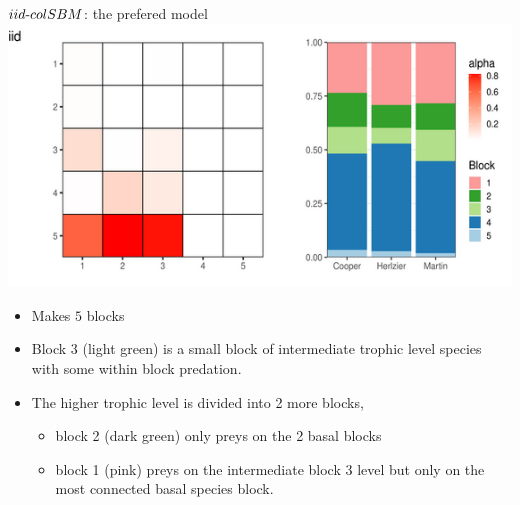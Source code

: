 \documentclass[compress,10pt]{beamer}
\begin{document}
%   
% 
% 

\begin{frame}{$iid\text{-}colSBM$: the prefered model}
\centering
\includegraphics[width =0.5 \textwidth]{plots/plot_iidcolsbm}


\begin{itemize}
 \item Makes $5$ blocks
 \item  Block 3 (light green) is a small block
of intermediate trophic level species with some within block predation.

\item The higher trophic level is divided into 2 more blocks,
\begin{itemize}
\item block 2 (dark green) only preys on the 2 basal blocks
\item  block 1 (pink) preys on the intermediate block 3 level but only on the most connected basal species block.
\end{itemize}
\end{itemize}

\end{frame}
\end{document}
